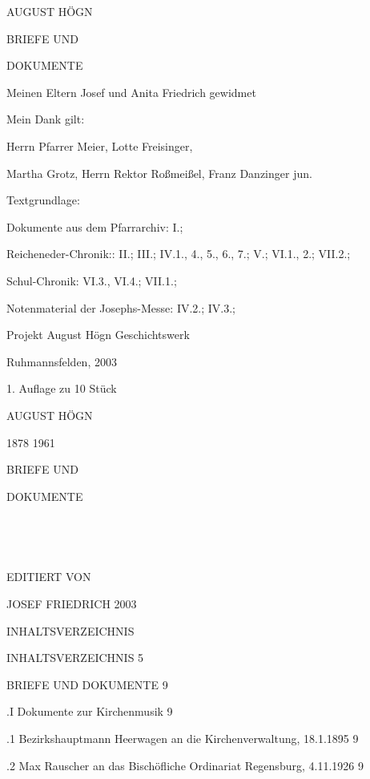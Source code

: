 \documentclass{book}
\begin{document}
AUGUST HÖGN

BRIEFE UND

DOKUMENTE

Meinen Eltern Josef und Anita Friedrich gewidmet


Mein Dank gilt:

Herrn Pfarrer Meier, Lotte Freisinger,

Martha Grotz, Herrn Rektor Roßmeißel, Franz Danzinger jun.



Textgrundlage:

Dokumente aus dem Pfarrarchiv: I.;

Reicheneder-Chronik:: II.; III.; IV.1., 4., 5.,  6.,  7.; V.; VI.1., 2.; VII.2.;

Schul-Chronik: VI.3., VI.4.; VII.1.;

Notenmaterial der Josephs-Messe: IV.2.; IV.3.;


Projekt August Högn Geschichtswerk

Ruhmannsfelden, 2003

1. Auflage zu 10 Stück

AUGUST HÖGN

1878 1961





BRIEFE UND

DOKUMENTE



























EDITIERT VON

JOSEF FRIEDRICH 2003





INHALTSVERZEICHNIS

INHALTSVERZEICHNIS  5

BRIEFE UND DOKUMENTE    9

.I Dokumente zur Kirchenmusik   9

.1 Bezirkshauptmann Heerwagen an die Kirchenverwaltung, 18.1.1895   9

.2 Max Rauscher an das Bischöfliche Ordinariat Regensburg, 4.11.1926    9
\end{document}
